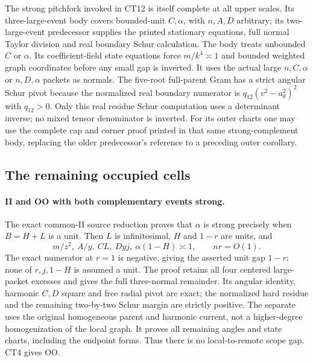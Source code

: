 The strong pitchfork invoked in CT12 is itself complete at all
upper scales.  Its three-large-event body covers bounded-unit
\(C,\alpha\), with \(n,A,D\) arbitrary; its two-large-event
predecessor supplies the printed stationary equations, full
normal Taylor division and real boundary Schur calculation.
The body  treats
unbounded \(C\) or \(\alpha\).  Its coefficient-field state
equations force \(m/k^4\asymp1\) and bounded weighted graph
coordinates before any small gap is inverted.  It uses the
actual large \(n,C,\alpha\) or \(n,D,\alpha\) packets as normals.
The five-root full-parent Gram has a strict angular Schur pivot
because the normalized real boundary numerator is
\(q_{12}(v^2-a_0^2)^2\) with \(q_{12}>0\).
Only this real residue Schur computation uses a determinant
inverse; no mixed tensor denominator is inverted.
For its outer charts one may use the complete cap and corner
proof printed in that same strong-complement body, replacing
the older predecessor's reference to a preceding outer corollary.

\subsection{The remaining occupied cells}

\paragraph{II and OO with both complementary events strong.}
The exact common-II source reduction proves that
\(\alpha\) is strong precisely when \(B=H+L\) is a unit.
Then \(L\) is infinitesimal, \(H\) and \(1-r\) are units, and
\[
 m/z^2,\ A/y,\ CL,\ Dyj,\ \alpha(1-H)\asymp1,
 \qquad nr=O(1).                                      \tag{CT14}
\]
The exact numerator at \(r=1\) is negative, giving the asserted
unit gap \(1-r\); none of \(r,j,1-H\) is assumed a unit.
The proof  retains all four centered
large-packet excesses and gives the full three-normal remainder.
Its angular identity, harmonic \(C,D\) square and free radial
pivot are exact; the normalized hard residue and the remaining
two-by-two Schur margin are strictly positive.
The separate  uses the original
homogeneous parent and harmonic current, not a higher-degree
homogenization of the local graph.  It proves all remaining
angles and state charts, including the endpoint forms.
Thus there is no local-to-remote scope gap.  CT4 gives OO.

